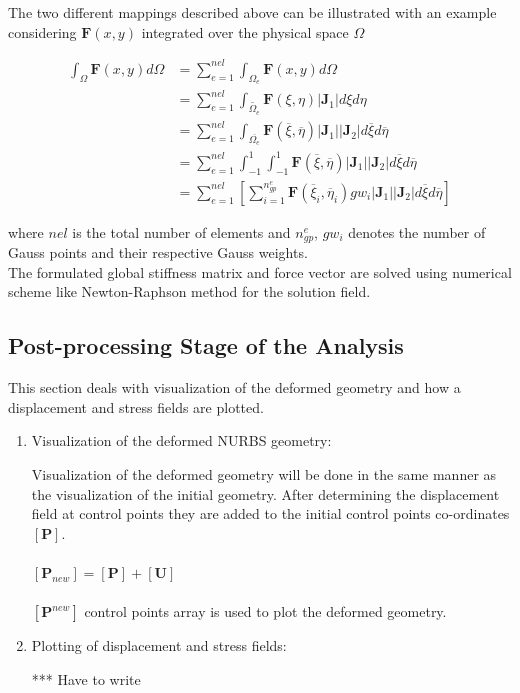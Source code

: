 \documentclass[12pt]{article}
\begin{document}
The two different mappings described above can be illustrated with an example considering $ \textbf{F}(x,y)$ integrated over the physical space $\Omega$

\begin{equation*}
\begin{split}
\int_{\Omega} \textbf{F}(x,y)d\Omega & = \sum_{e=1}^{nel} \int_{\Omega_e} \textbf{F}(x,y) d\Omega  \\
 & = \sum_{e=1}^{nel} \int_{\widetilde{\Omega_e}} \textbf{F}(\xi,\eta)|\textbf{J}_1| d\xi d\eta \\
 & = \sum_{e=1}^{nel} \int_{\overline{\Omega_e}} \textbf{F}(\overline\xi,\overline\eta)|\textbf{J}_1||\textbf{J}_2| d\overline\xi d\overline\eta  \\
 & = \sum_{e=1}^{nel} \int_{-1}^{1} \int_{-1}^{1} \textbf{F}(\overline\xi,\overline\eta)|\textbf{J}_1||\textbf{J}_2| d\overline\xi d\overline\eta  \\
 & = \sum_{e=1}^{nel} \left[ \sum_{i=1}^{n_{gp}^e} \textbf{F}(\overline\xi_i,\overline\eta_i) gw_i |\textbf{J}_1||\textbf{J}_2| d\overline\xi d\overline\eta \right]
\end{split}
\end{equation*}

\noindent
where $nel$ is the total number of elements and $n_{gp}^e$, $gw_i$ denotes the number of Gauss points and their respective Gauss weights.\\
\noindent
The formulated global stiffness matrix and force vector are solved using numerical scheme like Newton-Raphson method for the solution field.

\subsection{Post-processing Stage of the Analysis}
This section deals with visualization of the deformed geometry and how a displacement and stress fields are plotted. 

\begin{enumerate}[leftmargin=*]
\item Visualization of the deformed NURBS geometry:

Visualization of the deformed geometry will be done in the same manner as the visualization of the initial geometry. After determining the displacement field at control points they are added to the initial control points co-ordinates $[\textbf{P}]$.\\
\\
$[\textbf{P}_{new}]=[\textbf{P}]+[\textbf{U}]$ \\
\\
$[\textbf{P}^{new}]$ control points array is used to plot the deformed geometry.

\item Plotting of displacement and stress fields:

*** Have to write
\end{enumerate}
\end{document}
